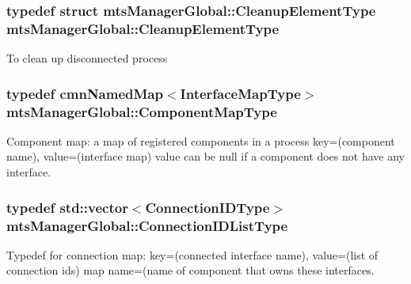 \subsubsection[{Cleanup\+Element\+Type}]{\setlength{\rightskip}{0pt plus 5cm}typedef struct {\bf mts\+Manager\+Global\+::\+Cleanup\+Element\+Type}  {\bf mts\+Manager\+Global\+::\+Cleanup\+Element\+Type}\hspace{0.3cm}{\ttfamily [protected]}}\label{classmts_manager_global_a52d8af643eef029ad83e5e430604261a}
To clean up disconnected process \hypertarget{classmts_manager_global_ab954b59b5453e8c20301f3772bb1484f}{}
\subsubsection[{Component\+Map\+Type}]{\setlength{\rightskip}{0pt plus 5cm}typedef {\bf cmn\+Named\+Map}$<${\bf Interface\+Map\+Type}$>$ {\bf mts\+Manager\+Global\+::\+Component\+Map\+Type}\hspace{0.3cm}{\ttfamily [protected]}}\label{classmts_manager_global_ab954b59b5453e8c20301f3772bb1484f}
Component map\+: a map of registered components in a process key=(component name), value=(interface map) value can be null if a component does not have any interface. \hypertarget{classmts_manager_global_a01bcfffc97f320cdd87425bd4bd5bbad}{}
\subsubsection[{Connection\+I\+D\+List\+Type}]{\setlength{\rightskip}{0pt plus 5cm}typedef std\+::vector$<${\bf Connection\+I\+D\+Type}$>$ {\bf mts\+Manager\+Global\+::\+Connection\+I\+D\+List\+Type}\hspace{0.3cm}{\ttfamily [protected]}}\label{classmts_manager_global_a01bcfffc97f320cdd87425bd4bd5bbad}
Typedef for connection map\+: key=(connected interface name), value=(list of connection ids) map name=(name of component that owns these interfaces. \hypertarget{classmts_manager_global_abee7afe21ca1987b873dbfdc3ac2fbfb}{}
